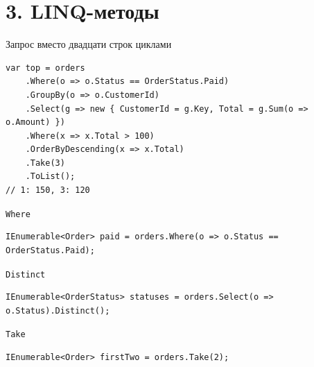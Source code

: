 \documentclass[aspectratio=169,10pt,t]{beamer}
\begin{document}
\section{3. LINQ-методы}

\begin{frame}[plain]
\end{frame}

\begin{frame}[fragile]{Запрос вместо двадцати строк циклами}
  \slidetop
\begin{lstlisting}[style=csharp,basicstyle=\ttfamily\fontsize{7.0}{8.2}\selectfont]
var top = orders
    .Where(o => o.Status == OrderStatus.Paid)
    .GroupBy(o => o.CustomerId)
    .Select(g => new { CustomerId = g.Key, Total = g.Sum(o => o.Amount) })
    .Where(x => x.Total > 100)
    .OrderByDescending(x => x.Total)
    .Take(3)
    .ToList();
// 1: 150, 3: 120
\end{lstlisting}

  \slidegap
\end{frame}

\begin{frame}[fragile]{\texttt{Where}}
  \slidetop
\begin{lstlisting}[style=csharp,basicstyle=\ttfamily\small]
IEnumerable<Order> paid = orders.Where(o => o.Status == OrderStatus.Paid);
\end{lstlisting}
\end{frame}

\begin{frame}[fragile]{\texttt{Distinct}}
  \slidetop
\begin{lstlisting}[style=csharp,basicstyle=\ttfamily\small]
IEnumerable<OrderStatus> statuses = orders.Select(o => o.Status).Distinct();
\end{lstlisting}
  \slidegap
\end{frame}

\begin{frame}[fragile]{\texttt{Take}}
  \slidetop
\begin{lstlisting}[style=csharp,basicstyle=\ttfamily\small]
IEnumerable<Order> firstTwo = orders.Take(2);
\end{lstlisting}
\end{frame}
\end{document}
